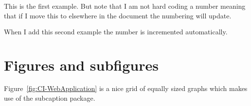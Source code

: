\documentclass{article}
\begin{document}
\begin{example}	This is the first example. But note that I am not hard coding a number meaning that if I move this to elsewhere in the document the numbering will update. \end{example}

\begin{example}	When I add this second example the number is incremented automatically. \end{example}


\section{Figures and subfigures}

Figure~\ref{fig:CI-WebApplication} is a nice grid of equally sized graphs which makes use of the subcaption package.
\end{document}
